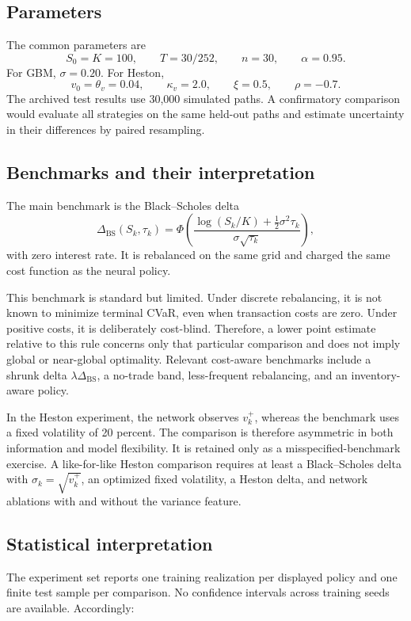 \subsection{Parameters}

The common parameters are
\[
  S_0=K=100,\qquad T=30/252,\qquad n=30,
  \qquad \alpha=0.95.
\]
For GBM, $\sigma=0.20$. For Heston,
\[
  v_0=\theta_v=0.04,\qquad \kappa_v=2.0,
  \qquad \xi=0.5,\qquad \rho=-0.7.
\]
The archived test results use 30,000 simulated paths. A confirmatory
comparison would evaluate all strategies on the same held-out paths and estimate
uncertainty in their differences by paired resampling.

\subsection{Benchmarks and their interpretation}

The main benchmark is the Black--Scholes delta
\[
  \Delta_{\mathrm{BS}}(S_k,\tau_k)
  =\Phi\!\left(
    \frac{\log(S_k/K)+\tfrac12\sigma^2\tau_k}
         {\sigma\sqrt{\tau_k}}
  \right),
\]
with zero interest rate. It is rebalanced on the same grid and charged the same
cost function as the neural policy.

This benchmark is standard but limited. Under discrete rebalancing, it is not
known to minimize terminal CVaR, even when transaction costs are zero. Under
positive costs, it is deliberately cost-blind. Therefore, a lower point estimate relative to this rule concerns only
that particular comparison and does not imply global or near-global optimality. Relevant cost-aware benchmarks include a shrunk delta
$\lambda\Delta_{\mathrm{BS}}$, a no-trade band, less-frequent rebalancing, and
an inventory-aware policy.

In the Heston experiment, the network observes $v_k^+$, whereas the benchmark
uses a fixed volatility of 20 percent. The comparison is therefore asymmetric
in both information and model flexibility. It is retained only as a
misspecified-benchmark exercise. A like-for-like Heston comparison requires at
least a Black--Scholes delta with $\sigma_k=\sqrt{v_k^+}$, an optimized fixed
volatility, a Heston delta, and network ablations with and without the variance
feature.

\subsection{Statistical interpretation}

The experiment set reports one training realization per displayed policy and
one finite test sample per comparison. No confidence intervals across training
seeds are available. Accordingly:

